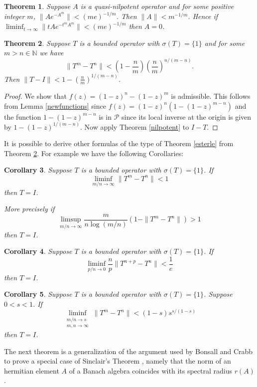\documentclass[12pt]{amsart}
\newtheorem{thm}{Theorem}[section]
\newtheorem{cor}[thm]{Corollary}
\begin{document}
\begin{thm} Suppose $A$ is a quasi-nilpotent operator and for some
positive integer $m$, $\|Ae^{-A^m}\|< (me)^{-1/m}$.  Then $\|A\|<
m^{-1/m}$.  Hence if
$\liminf_{t\to\infty}\|tAe^{-t^mA^m}\|<(me)^{-1/m}$ then $A=0$.
\end{thm}

\begin{thm}\label{esterle2} Suppose $T$ is a bounded operator with
$\sigma(T)=\{1\}$ and for some $m>n\in\mathbb N$ we have
$$\|T^m-T^n\|<\left(1-\frac{n}{m}\right) \left(\frac{n}{m}\right)^{n/(m-n)}.$$  Then
$\|T-I\|<1-(\frac{n}{m})^{1/(m-n)}$.\end{thm}

\begin{proof} We show that $f(z)=(1-z)^n-(1-z)^m$ is admissible.
This follows from Lemma \ref{newfunctions} since $f(z)= (1-z)^n
(1-(1-z)^{m-n})$ and the function $1-(1-z)^{m-n}$ is in $\mathcal
P$ since its local inverse at the origin is given by
$1-(1-z)^{1/(m-n)}$.  Now apply Theorem \ref{nilpotent} to $I-T$.
\end{proof}

It is possible to derive  other formulas of the type of Theorem
\ref{esterle} from Theorem \ref{esterle2}.  For example we have
the following Corollaries:

\begin{cor}  Suppose $T$ is a bounded operator with
$\sigma(T)=\{1\}$. If $$ \liminf_{m/n\to\infty}\|T^m-T^n\|<1$$
then $T=I$.

More precisely if
$$ \limsup_{m/n\to\infty} \frac{m}{n\log(m/n)}(1-\|T^m-T^n\|)>1$$
then $T=I$.\end{cor}

\begin{cor}
Suppose $T$ is a bounded operator with $\sigma(T)=\{1\}$. If $$
\liminf_{p/n\to 0}\frac{n}{p}\|T^{n+p}-T^n\|<\frac1e$$ then $T=I$.
\end{cor}

\begin{cor}
Suppose $T$ is a bounded operator with $\sigma(T)=\{1\}$. Suppose
$0<s<1$. If
$$ \liminf_{\substack{m/n\to s\\ m,n\to\infty}}
\|T^{m}-T^n\|<(1-s)s^{s/(1-s)}$$ then
$T=I$.\end{cor}





The next theorem is a generalization of the argument used
by Bonsall and
Crabb \cite{bonsall-crabb}
to prove a special case of Sinclair's Theorem \cite{sinclair}, namely that
the norm of an hermitian element $A$ of a Banach algebra coincides
with its spectral radius $r(A)$.
\end{document}
